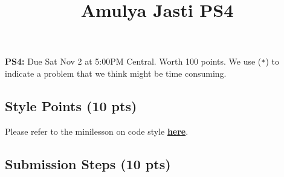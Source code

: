 \documentclass[
  letterpaper,
  DIV=11,
  numbers=noendperiod]{scrartcl}
\title{Amulya Jasti PS4}
\author{}
\date{}
\begin{document}
\maketitle



\textbf{PS4:} Due Sat Nov 2 at 5:00PM Central. Worth 100 points. We use
(\texttt{*}) to indicate a problem that we think might be time
consuming.

\subsection{Style Points (10 pts)}\label{style-points-10-pts}

Please refer to the minilesson on code style
\textbf{\href{https://uchicago.zoom.us/rec/share/pG_wQ-pHTQrJTmqNn4rcrw5V194M2H2s-2jdy8oVhWHkd_yZt9o162IWurpA-fxU.BIQlSgZLRYctvzp-}{here}}.

\subsection{Submission Steps (10 pts)}\label{submission-steps-10-pts}
\end{document}
